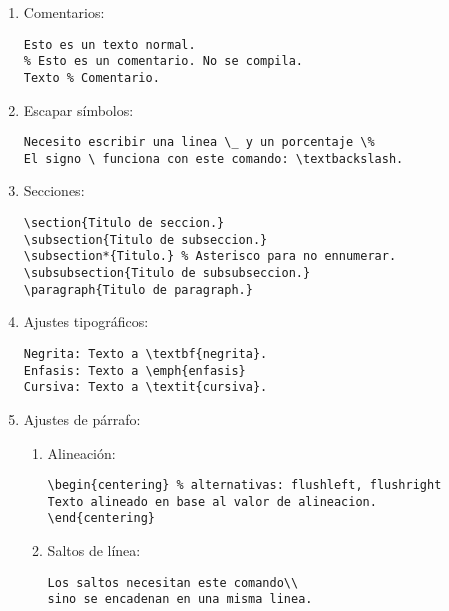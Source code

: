 \begin{enumerate}
\item Comentarios:
\begin{lstlisting}
Esto es un texto normal.
% Esto es un comentario. No se compila.
Texto % Comentario.
\end{lstlisting}
\item Escapar símbolos:
\begin{lstlisting}
Necesito escribir una linea \_ y un porcentaje \%
El signo \ funciona con este comando: \textbackslash.
\end{lstlisting}
\item Secciones:
\begin{lstlisting}
\section{Titulo de seccion.}
\subsection{Titulo de subseccion.}
\subsection*{Titulo.} % Asterisco para no ennumerar.
\subsubsection{Titulo de subsubseccion.}
\paragraph{Titulo de paragraph.}
\end{lstlisting}
\item Ajustes tipográficos:
\begin{lstlisting}
Negrita: Texto a \textbf{negrita}.
Enfasis: Texto a \emph{enfasis}
Cursiva: Texto a \textit{cursiva}.
\end{lstlisting}

\item Ajustes de párrafo:
	\begin{enumerate}
	\item Alineación:
	\begin{lstlisting}
\begin{centering} % alternativas: flushleft, flushright
Texto alineado en base al valor de alineacion.
\end{centering}
	\end{lstlisting}
	\item Saltos de línea:
	\begin{lstlisting}
Los saltos necesitan este comando\\
sino se encadenan en una misma linea.


\end{lstlisting}
\end{enumerate}
\end{enumerate}
